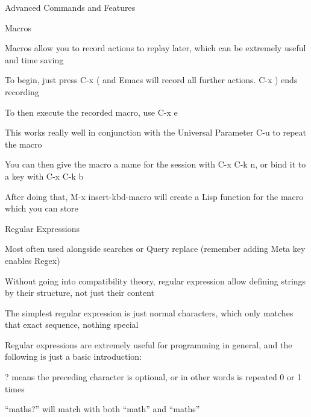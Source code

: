 \documentclass[presentation]{beamer}
\begin{document}
\begin{frame}[fragile,label=sec-4]{Advanced Commands and Features}
 \begin{block}{Macros}
\begin{block}{Macros allow you to record actions to replay later, which can be extremely useful and time saving}
\end{block}
\begin{block}{To begin, just press C-x ( and Emacs will record all further actions. C-x ) ends recording}
\end{block}
\begin{block}{To then execute the recorded macro, use C-x e}
\begin{block}{This works really well in conjunction with the Universal Parameter C-u to repeat the macro}
\end{block}
\begin{block}{You can then give the macro a name for the session with C-x C-k n, or bind it to a key with C-x C-k b}
\end{block}
\begin{block}{After doing that, M-x insert-kbd-macro will create a Lisp function for the macro which you can store}
\end{block}
\end{block}
\end{block}
\begin{block}{Regular Expressions}
\begin{block}{Most often used alongside searches or Query replace (remember adding Meta key enables Regex)}
\end{block}
\begin{block}{Without going into compatibility theory, regular expression allow defining strings by their structure, not just their content}
\end{block}
\begin{block}{The simplest regular expression is just normal characters, which only matches that exact sequence, nothing special}
\end{block}
\begin{block}{Regular expressions are extremely useful for programming in general, and the following is just a basic introduction:}
\begin{block}{? means the preceding character is optional, or in other words is repeated 0 or 1 times}
\begin{block}{``maths?'' will match with both ``math'' and ``maths''}
\end{block}

\end{block}
\end{block}
\end{block}
\end{frame}
\end{document}
